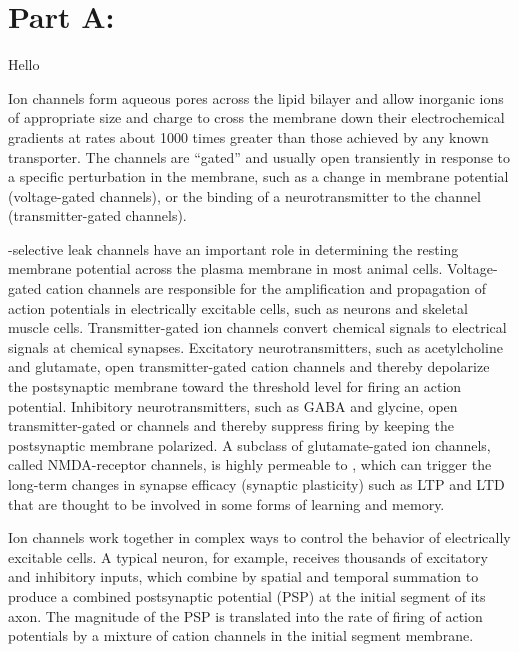 \documentclass[12pt,a4paper]{article}
\begin{document}
\raggedright
\section*{Part A: }
\begin{enumerate}[font=\bfseries, wide]
    {\color{gray}\item Hello}\par
    
    Ion channels form aqueous pores across the lipid bilayer and allow inorganic ions of appropriate size and charge to cross the membrane down their electrochemical gradients at rates about 1000 times greater than those achieved by any known transporter. The channels are “gated” and usually open transiently in response to a specific perturbation in the membrane, such as a change in membrane potential (voltage-gated channels), or the binding of a neurotransmitter to the channel (transmitter-gated channels).\par
    -selective leak channels have an important role in determining the resting membrane potential across the plasma membrane in most animal cells.  Voltage-gated cation channels are responsible for the amplification and propagation of action potentials in electrically excitable cells, such as neurons and skeletal muscle cells. Transmitter-gated ion channels convert chemical signals to electrical signals at chemical synapses. Excitatory neurotransmitters, such as acetylcholine and glutamate, open transmitter-gated cation channels and thereby depolarize the postsynaptic membrane toward the threshold level for firing an action potential. Inhibitory neurotransmitters, such as GABA and glycine, open transmitter-gated  or  channels and thereby suppress firing by keeping the postsynaptic membrane polarized. A subclass of glutamate-gated ion channels, called NMDA-receptor channels, is highly permeable to , which can trigger the long-term changes in synapse efficacy (synaptic plasticity) such as LTP and LTD that are thought to be involved in some forms of learning and memory.\par 
    Ion channels work together in complex ways to control the behavior of electrically excitable cells. A typical neuron, for example, receives thousands of excitatory and inhibitory inputs, which combine by spatial and temporal summation to produce a combined postsynaptic potential (PSP) at the initial segment of its axon. The magnitude of the PSP is translated into the rate of firing of action potentials by a mixture of cation channels in the initial segment membrane.
\end{enumerate}
\end{document}
